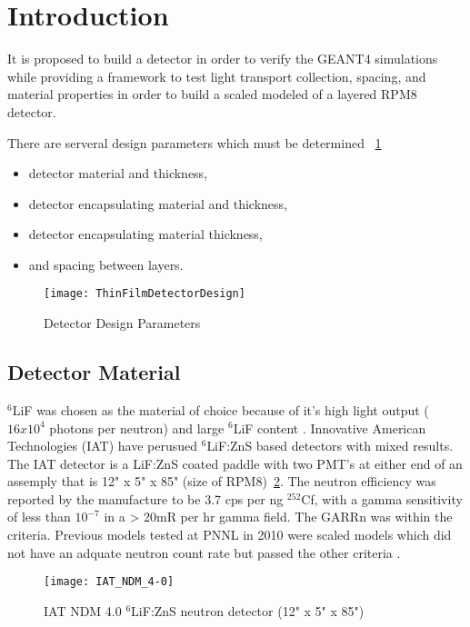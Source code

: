 \section{Introduction}
It is proposed to build a detector in order to verify the GEANT4 simulations while providing a framework to test light transport collection, spacing, and material properties in order to build a scaled modeled of a layered RPM8 detector.

There are serveral design parameters which must be determined ~\ref{fig:DetectorParameterSchematic}
\begin{itemize}
    \item detector material and thickness,
    \item detector encapsulating material and thickness,
    \item detector encapsulating material thickness,
    \item and spacing between layers.
\end{itemize}
\begin{figure}
    \centering
    \texttt{[image: ThinFilmDetectorDesign]}
    \caption{Detector Design Parameters}
    \label{fig:DetectorParameterSchematic}
\end{figure}

\subsection{Detector Material}
${}^6$LiF was chosen as the material of choice because of it's high light output ($16x10^4$ photons per neutron) and large ${}^{6}$LiF content \cite{carel_w.e_inorganic-scintillators_2001}. 
Innovative American Technologies (IAT) have perusued ${}^6$LiF:ZnS based detectors with mixed results.
The IAT detector is a LiF:ZnS coated paddle with two PMT's at either end of an assemply that is 12" x 5" x 85" (size of RPM8)~\ref{fig:IATPaddle}.
The neutron efficiency was reported by the manufacture to be 3.7 cps per ng ${}^{252}$Cf, with a gamma sensitivity of less than $10^{-7}$ in a > 20mR per hr gamma field.  The GARRn was within the criteria.
Previous models tested at PNNL in 2010 were scaled models which did not have an adquate neutron count rate but passed the other criteria \cite{kouzes_lithium_2010}.
\begin{figure}
    \centering
    \texttt{[image: IAT\_NDM\_4-0]}
    \caption{IAT NDM 4.0 ${}^6$LiF:ZnS neutron detector (12" x 5" x 85")}
    \label{fig:IATPaddle}
\end{figure}

